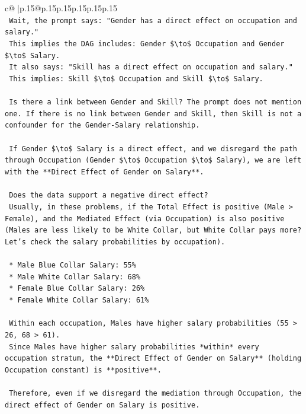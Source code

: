\documentclass{article}
\begin{document}
{\begin{supertabular}{c@{$\;$}|p{.15\linewidth}@{}p{.15\linewidth}p{.15\linewidth}p{.15\linewidth}p{.15\linewidth}p{.15\linewidth}}
{{{\\ 
\texttt{    Wait, the prompt says: "Gender has a direct effect on occupation and salary."} \\
\texttt{    This implies the DAG includes: Gender \$\textbackslash{}to\$ Occupation and Gender \$\textbackslash{}to\$ Salary.} \\
\texttt{    It also says: "Skill has a direct effect on occupation and salary."} \\
\texttt{    This implies: Skill \$\textbackslash{}to\$ Occupation and Skill \$\textbackslash{}to\$ Salary.} \\
\\ 
\texttt{    Is there a link between Gender and Skill? The prompt does not mention one. If there is no link between Gender and Skill, then Skill is not a confounder for the Gender{-}Salary relationship.} \\
\\ 
\texttt{    If Gender \$\textbackslash{}to\$ Salary is a direct effect, and we disregard the path through Occupation (Gender \$\textbackslash{}to\$ Occupation \$\textbackslash{}to\$ Salary), we are left with the **Direct Effect of Gender on Salary**.} \\
\\ 
\texttt{    Does the data support a negative direct effect?} \\
\texttt{    Usually, in these problems, if the Total Effect is positive (Male > Female), and the Mediated Effect (via Occupation) is also positive (Males are less likely to be White Collar, but White Collar pays more? Let's check the salary probabilities by occupation).} \\
\\ 
\texttt{    *   Male Blue Collar Salary: 55\%} \\
\texttt{    *   Male White Collar Salary: 68\%} \\
\texttt{    *   Female Blue Collar Salary: 26\%} \\
\texttt{    *   Female White Collar Salary: 61\%} \\
\\ 
\texttt{    Within each occupation, Males have higher salary probabilities (55 > 26, 68 > 61).} \\
\texttt{    Since Males have higher salary probabilities *within* every occupation stratum, the **Direct Effect of Gender on Salary** (holding Occupation constant) is **positive**.} \\
\\ 
\texttt{    Therefore, even if we disregard the mediation through Occupation, the direct effect of Gender on Salary is positive.} \\
}}}
\end{supertabular}}
\end{document}
